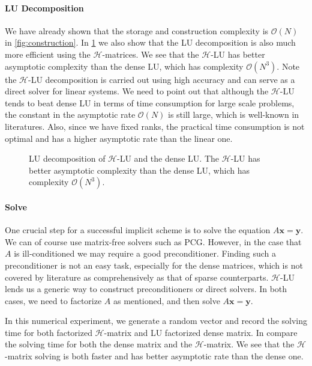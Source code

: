 \documentclass[3p,,preprint,12pt]{elsarticle}
\newcommand{\bx}[0]{\mathbf{x}}
\theoremstyle{definition}
\newcommand{\by}[0]{\mathbf{y}}
\begin{document}
\paragraph{LU Decomposition}

We have already shown that the storage and construction complexity is $\mathcal{O}(N)$ in \cref{fig:construction}. In \cref{fig:lu} we also show that the LU decomposition is also much more efficient using the $\mathcal{H}$-matrices. We see that the $\mathcal{H}$-LU has better asymptotic complexity than the dense LU, which has complexity $\mathcal{O}(N^3)$. Note the $\mathcal{H}$-LU decomposition is carried out using high accuracy and can serve as a direct solver for linear systems. We need to point out that although the $\mathcal{H}$-LU tends to beat dense LU in terms of time consumption for large scale problems, the constant in the asymptotic rate $\mathcal{O}(N)$ is still large, which is well-known in literatures. Also, since we have fixed ranks, the practical time consumption is not optimal and has a higher asymptotic rate than the linear one. 

\begin{figure}[htpb]
\centering
\scalebox{0.6}{}
\caption{LU decomposition of $\mathcal{H}$-LU and the dense LU. The $\mathcal{H}$-LU has better asymptotic complexity than the dense LU, which has complexity $\mathcal{O}(N^3)$.}
\label{fig:lu}
\end{figure}



\paragraph{Solve}

One crucial step for a successful implicit scheme is to solve the equation $A\bx=\by$. We can of course use matrix-free solvers such as PCG. However, in the case that $A$ is ill-conditioned we may require a good preconditioner. Finding such a preconditioner is not an easy task, especially for the dense matrices, which is not covered by literature as comprehensively as that of sparse counterparts. $\mathcal{H}$-LU lends us a generic way to construct preconditioners or direct solvers. In both cases, we need to factorize $A$ as mentioned, and then solve $A\bx=\by$. 

In this numerical experiment, we generate a random vector and record the solving time for both factorized $\mathcal{H}$-matrix and LU factorized dense matrix. In  compare the solving time for both the dense matrix and the $\mathcal{H}$-matrix. We see that the $\mathcal{H}$-matrix solving is both faster and has better asymptotic rate than the dense one.
\end{document}
